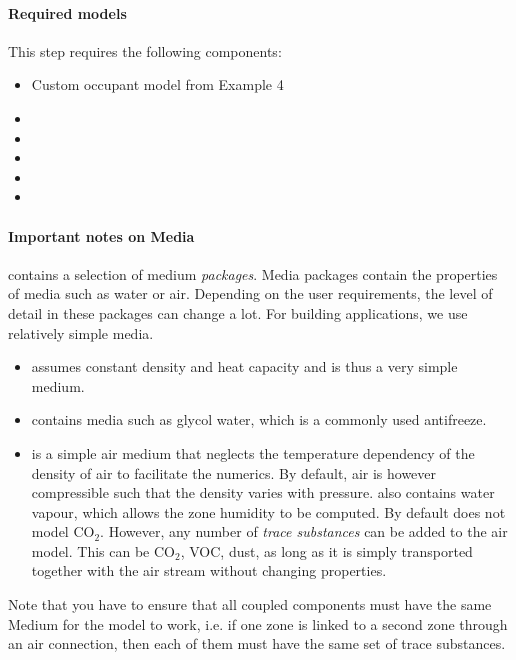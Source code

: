 \documentclass[10pt,a4paper]{article}
\begin{document}
\paragraph{Required models}
This step requires the following components:
\begin{itemize}
\item Custom occupant model from Example 4
\item {}
\item {}
\item {}
\item {}
\item {}
\end{itemize}

\paragraph{Important notes on Media}
 contains a selection of medium \textit{packages}. 
Media packages contain the properties of media such as water or air.
Depending on the user requirements, the level of detail in these packages can change a lot.
For building applications, we use relatively simple media.
\begin{itemize}
	\item {} assumes constant density and heat capacity and is thus
	a very simple medium.
	\item {} contains media such as glycol water,
	which is a commonly used antifreeze.
	\item {} is a simple air medium that 
	neglects the temperature dependency of the density of air to
	facilitate the numerics. By default, air is however compressible such that the density
	varies with pressure.
	 also contains water vapour,
	which allows the zone humidity to be computed. By default  does not model CO$_2$.
	However, any number of \textit{trace substances} can be added to the air model.
	This can be CO$_2$, VOC, dust, as long as it is simply transported together
	with the air stream without changing properties.
\end{itemize}

Note that you have to ensure that all coupled components must have the same Medium
for the model to work, i.e. if one zone is linked to a second zone through an air connection,
then each of them must have the same set of trace substances.
\end{document}
